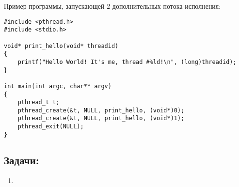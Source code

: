 \documentclass{article}
\begin{document}
Пример программы, запускающей 2 дополнительных потока исполнения:
\begin{lstlisting}
#include <pthread.h>
#include <stdio.h>

void* print_hello(void* threadid)
{
    printf("Hello World! It's me, thread #%ld!\n", (long)threadid);
}

int main(int argc, char** argv)
{
    pthread_t t;
    pthread_create(&t, NULL, print_hello, (void*)0);
    pthread_create(&t, NULL, print_hello, (void*)1);
    pthread_exit(NULL);
}
\end{lstlisting}

\subsection*{Задачи:}
\begin{enumerate}
\item \textbf{}
\end{enumerate}
\end{document}
